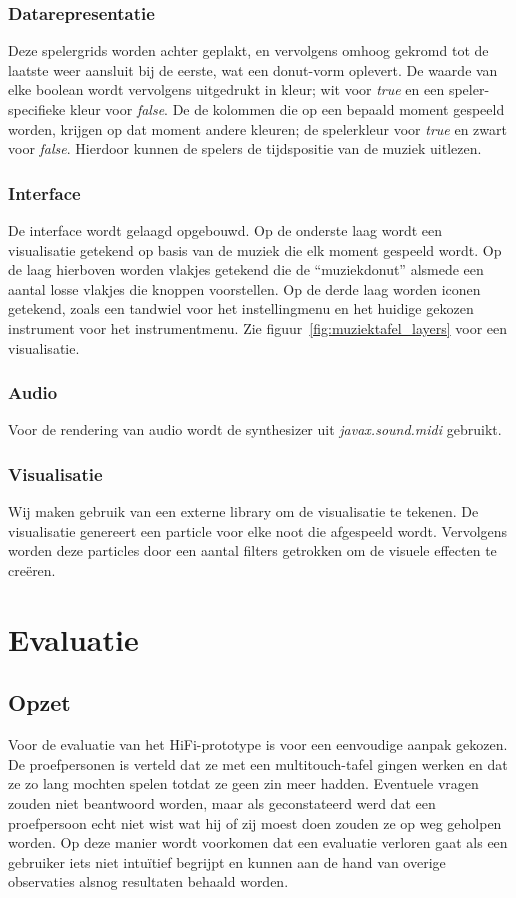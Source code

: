 \documentclass{acm}
\begin{document}
\subsubsection{Datarepresentatie}
Deze spelergrids worden achter geplakt, en vervolgens omhoog gekromd tot de laatste weer aansluit bij de eerste, wat een donut-vorm oplevert. De waarde van elke boolean wordt vervolgens uitgedrukt in kleur; wit voor \textit{true} en een speler-specifieke kleur voor \textit{false}. De de kolommen die op een bepaald moment gespeeld worden, krijgen op dat moment andere kleuren; de spelerkleur voor \textit{true} en zwart voor \textit{false}. Hierdoor kunnen de spelers de tijdspositie van de muziek uitlezen.

\subsubsection{Interface}
De interface wordt gelaagd opgebouwd. Op de onderste laag wordt een visualisatie getekend op basis van de muziek die elk moment gespeeld wordt. Op de laag hierboven worden vlakjes getekend die de “muziekdonut” alsmede een aantal losse vlakjes die knoppen voorstellen. Op de derde laag worden iconen getekend, zoals een tandwiel voor het instellingmenu en het huidige gekozen instrument voor het instrumentmenu. Zie figuur~\ref{fig:muziektafel_layers} voor een visualisatie.

\subsubsection{Audio}
Voor de rendering van audio wordt de synthesizer uit \textit{javax.sound.midi} gebruikt.

\subsubsection{Visualisatie}
Wij maken gebruik van een externe library om de visualisatie te tekenen. De visualisatie genereert een particle voor elke noot die afgespeeld wordt. Vervolgens worden deze particles door een aantal filters getrokken om de visuele effecten te creëren.


\section{Evaluatie}
\label{sec_evaluatie}

\subsection{Opzet}
Voor de evaluatie van het HiFi-prototype is voor een eenvoudige aanpak gekozen. De proefpersonen is verteld dat ze met een multitouch-tafel gingen werken en dat ze zo lang mochten spelen totdat ze geen zin meer hadden. Eventuele vragen zouden niet beantwoord worden, maar als geconstateerd werd dat een proefpersoon echt niet wist wat hij of zij moest doen zouden ze op weg geholpen worden. Op deze manier wordt voorkomen dat een evaluatie verloren gaat als een gebruiker iets niet intuïtief begrijpt en kunnen aan de hand van overige observaties alsnog resultaten behaald worden.
\end{document}
